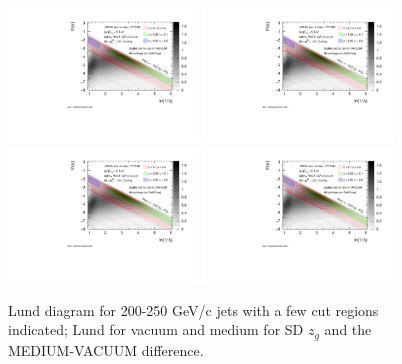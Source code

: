 \begin{figure}[htbp]
	\centering
	\includegraphics[width=0.45\textwidth,page=5]{figures/lund/lund_zg}
	\includegraphics[width=0.45\textwidth,page=6]{figures/lund/lund_zg}
	\includegraphics[width=0.45\textwidth,page=7]{figures/lund/lund_zg}
	\includegraphics[width=0.45\textwidth,page=8]{figures/lund/lund_zg}
	\caption{Lund diagram for 200-250 GeV/c jets with a few cut regions indicated; Lund for vacuum and medium for SD $z_{g}$ and the MEDIUM-VACUUM difference.}
	\label{fig:Lund_zg_highpt}
\end{figure}


